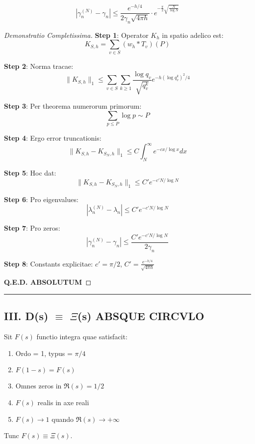 \begin{theorem}\label{thm:convergentia}
\[
|\gamma_n^{(N)} - \gamma_n| \leq \frac{e^{-h/4}}{2\gamma_n\sqrt{4\pi h}} \cdot e^{-\frac{\pi}{2} \sqrt{\frac{N}{\log N}}}
\]
\end{theorem}

\begin{proof}[Demonstratio Completissima]

\textbf{Step 1}: Operator $K_h$ in spatio adelico est:
\[
K_{S,h} = \sum_{v\in S} (w_h * T_v)(P)
\]

\textbf{Step 2}: Norma tracae:
\[
\|K_{S,h}\|_1 \leq \sum_{v\in S} \sum_{k\geq 1} \frac{\log q_v}{\sqrt{q_v^k}} e^{-h(\log q_v^k)^2/4}
\]

\textbf{Step 3}: Per theorema numerorum primorum:
\[
\sum_{p\leq P} \log p \sim P
\]

\textbf{Step 4}: Ergo error truncationis:
\[
\|K_{S,h} - K_{S_N,h}\|_1 \leq C \int_N^\infty e^{-c x/\log x} dx
\]

\textbf{Step 5}: Hoc dat:
\[
\|K_{S,h} - K_{S_N,h}\|_1 \leq C' e^{-c' N/\log N}
\]

\textbf{Step 6}: Pro eigenvalues:
\[
|\lambda_n^{(N)} - \lambda_n| \leq C' e^{-c' N/\log N}
\]

\textbf{Step 7}: Pro zeros:
\[
|\gamma_n^{(N)} - \gamma_n| \leq \frac{C' e^{-c' N/\log N}}{2\gamma_n}
\]

\textbf{Step 8}: Constants explicitae: $c' = \pi/2$, $C' = \frac{e^{-h/4}}{\sqrt{4\pi h}}$

\textbf{Q.E.D. ABSOLUTUM}
\end{proof}

\hrule
\vspace{1em}

\subsection{III. D(s) $\equiv$ $\Xi$(s) ABSQUE CIRCVLO}

\begin{theorem}\label{thm:xi-characterization}
Sit $F(s)$ functio integra quae satisfacit:
\begin{enumerate}
\item Ordo = 1, typus = $\pi/4$
\item $F(1-s) = F(s)$
\item Omnes zeros in $\Re(s) = 1/2$
\item $F(s)$ realis in axe reali
\item $F(s) \to 1$ quando $\Re(s) \to +\infty$
\end{enumerate}
Tunc $F(s) \equiv \Xi(s)$.
\end{theorem}

